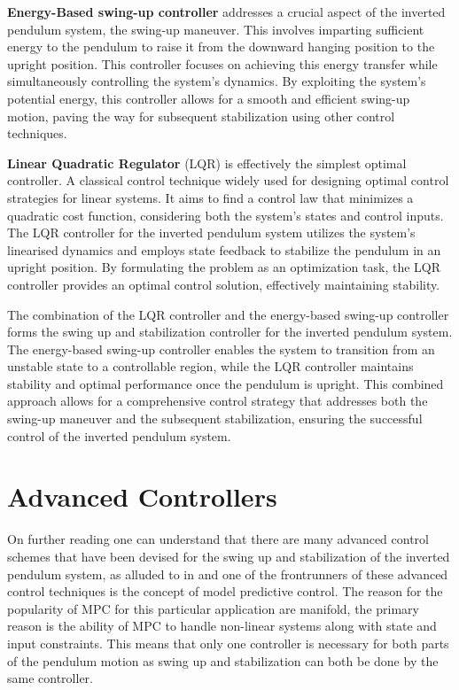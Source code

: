 \textbf{Energy-Based swing-up controller} addresses a crucial aspect of the inverted pendulum system, the swing-up maneuver. This involves imparting sufficient energy to the pendulum to raise it from the downward hanging position to the upright position. This controller focuses on achieving this energy transfer while simultaneously controlling the system's dynamics. By exploiting the system's potential energy, this controller allows for a smooth and efficient swing-up motion, paving the way for subsequent stabilization using other control techniques.

\textbf{Linear Quadratic Regulator} (LQR) is effectively the simplest optimal controller. A classical control technique widely used for designing optimal control strategies for linear systems. It aims to find a control law that minimizes a quadratic cost function, considering both the system's states and control inputs. The LQR controller for the inverted pendulum system utilizes the system's linearised dynamics and employs state feedback to stabilize the pendulum in an upright position. By formulating the problem as an optimization task, the LQR controller provides an optimal control solution, effectively maintaining stability.

The combination of the LQR controller and the energy-based swing-up controller forms the swing up and stabilization controller for the inverted pendulum system. The energy-based swing-up controller enables the system to transition from an unstable state to a controllable region, while the LQR controller maintains stability and optimal performance once the pendulum is upright. This combined approach allows for a comprehensive control strategy that addresses both the swing-up maneuver and the subsequent stabilization, ensuring the successful control of the inverted pendulum system.

\section{Advanced Controllers}

On further reading one can understand that there are many advanced control schemes that have been devised for the swing up and stabilization of the inverted pendulum system, as alluded to in \cite{Basuki2022,Oishi2018} and one of the frontrunners of these advanced control techniques is the concept of model predictive control. The reason for the popularity of MPC for this particular application are manifold, the primary reason is the ability of MPC to handle non-linear systems along with state and input constraints.
This means that only one controller is necessary for both parts of the pendulum motion as swing up and stabilization can both be done by the same controller.  




